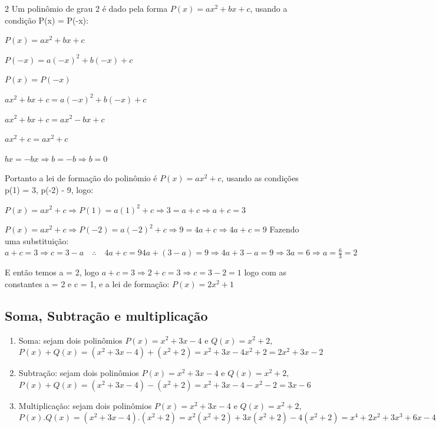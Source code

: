 \begin{multicols*}{2}
            Um polinômio de grau 2 é dado pela forma $P(x) = ax^2 + bx + c $, usando a condição 
            P(x) = P(-x):
            
            $P(x) = ax^2 + bx + c$
            
            $P(-x) = a(-x)^2 + b(-x) + c$
            
            $P(x) = P(-x)$
            
            $ax^2 + bx + c = a(-x)^2 + b(-x) + c$
            
            $ax^2 + bx + c = ax^2  - bx + c$
            
            $ax^2 + c = ax^2 + c$
            
            $bx = -bx \Rightarrow b = -b \Rightarrow b =0$
            
            Portanto a lei de formação do polinômio é $P(x) = ax^2 + c$, usando as condições  p(1) = 3, 			p(-2) - 9, logo: 
            
            $P(x) = ax^2 + c \Rightarrow P(1) = a(1)^2 + c \Rightarrow 3 = a + c \Rightarrow a+c = 3$
            
            $P(x) = ax^2 + c \Rightarrow P(-2) = a(-2)^2 + c \Rightarrow 9 = 4a + c \Rightarrow 4a+c = 9$
            Fazendo uma substituição: $a + c = 3 \Rightarrow c = 3 - a \quad \therefore \quad 4a +c = 9
            4a + (3-a) = 9 \Rightarrow 4a +3 -a = 9 \Rightarrow 3a = 6 \Rightarrow a = \frac{6}{3}  = 2$ 
            
            E então temos a = 2, logo $a+c = 3 \Rightarrow 2 + c = 3 \Rightarrow c = 3 - 2 = 1$ logo com as 		constantes a = 2 e c = 1, e a lei de formação: $P(x) = 2x^2 + 1$
            
            \subsection*{Soma, Subtração e multiplicação}
            \begin{enumerate}
            \item Soma: sejam dois polinômios $P(x) = x^2 + 3x - 4$ e $Q(x) = x^2 +2$, 
            $P(x) + Q(x) = (x^2 + 3x - 4) + (x^2 +2) = x^2 +3x -4 x^2 +2 = 2x^2 + 3x -2$
            \item Subtração: sejam dois polinômios $P(x) = x^2 + 3x - 4$ e $Q(x) = x^2 +2$, 
            $P(x) + Q(x) = (x^2 + 3x - 4) - (x^2 +2) = x^2 + 3x - 4 - x^2 - 2 = 3x - 6$
            \item Multiplicação: sejam dois polinômios $P(x) = x^2 + 3x - 4$ e $Q(x) = x^2 +2$,
            $P(x).Q(x) = (x^2 + 3x - 4).(x^2 +2) = x^2(x^2 +2) + 3x(x^2 +2) - 4(x^2 +2) = 
            x^4 + 2x^2 + 3x^3 + 6x - 4x^2 -8 = x^4 + 3x^3 - 2x^2 + 6x - 8$
            \end{enumerate}

\end{multicols*}
